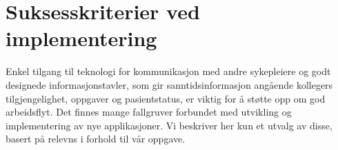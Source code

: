 \section{Suksesskriterier ved implementering}
\label{chp: suksesskriterier}


\noindent
Enkel tilgang til teknologi for kommunikasjon med andre sykepleiere og godt designede informasjonstavler, som gir sanntidsinformasjon angående kollegers tilgjengelighet, oppgaver og pasientstatus, er viktig for å støtte opp om god arbeidsflyt\cite{Ebright10}. Det finnes  mange fallgruver forbundet med utvikling og implementering av nye applikasjoner. Vi beskriver her kun et utvalg av disse, basert på relevns i forhold til vår oppgave.


